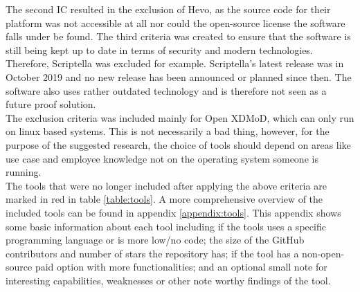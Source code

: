 \documentclass[11pt]{article}
\begin{document}
The second IC resulted in the exclusion of Hevo, as the source code for their platform was not accessible at all nor could the open-source license the software falls under be found. The third criteria was created to ensure that the software is still being kept up to date in terms of security and modern technologies. Therefore, Scriptella was excluded for example. Scriptella’s latest release was in October 2019 and no new release has been announced or planned since then. The software also uses rather outdated technology and is therefore not seen as a future proof solution. \\

The exclusion criteria was included mainly for Open XDMoD, which can only run on linux based systems. This is not necessarily a bad thing, however, for the purpose of the suggested research, the choice of tools should depend on areas like use case and employee knowledge not on the operating system someone is running. \\

The tools that were no longer included after applying the above criteria are marked in red in table \ref{table:tools}. A more comprehensive overview of the included tools can be found in appendix \ref{appendix:tools}. This appendix shows some basic information about each tool including if the tools uses a specific programming language or is more low/no code; the size of the GitHub contributors and number of stars the repository has; if the tool has a non-open-source paid option with more functionalities; and an optional small note for interesting capabilities, weaknesses or other note worthy findings of the tool. 
\end{document}
